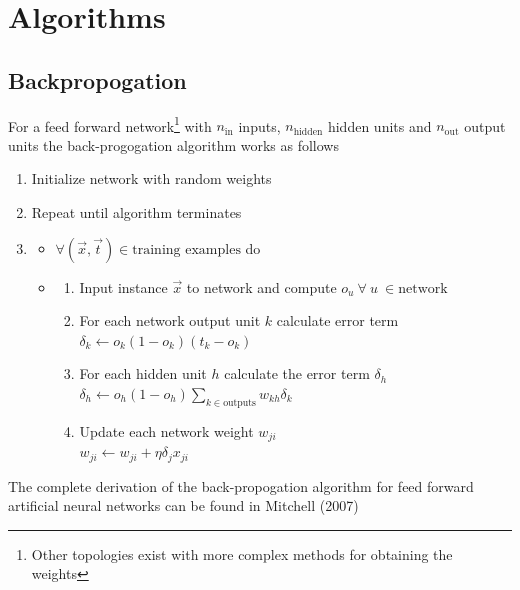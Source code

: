 
\chapter{Algorithms} \label{chap:app_algo}
\section{Backpropogation}
For a feed forward network\footnote{Other topologies exist with more complex methods for obtaining the weights} with $n_\text{in}$ inputs, $n_\text{hidden}$ hidden units and $n_\text{out}$ output units the back-progogation algorithm works as follows
\begin{enumerate}
\item Initialize network with random weights
\item Repeat until algorithm terminates
\item 
\begin{itemize}
\item $\forall (\vec{x},\vec{t}) \in \text{training examples}$ do
\item 
\begin{enumerate}
\item Input instance $\vec{x}$ to network and compute $o_u\ \forall\ u\ \in \text{network}$
\item For each network output unit $k$ calculate error term\\
$\delta_k \leftarrow o_k (1-o_k)(t_k - o_k)$
\item For each hidden unit $h$ calculate the error term $\delta_h$\\
$\delta_h \leftarrow o_h (1- o_h) \sum_{k \in \text{outputs}} w_{kh}\delta_k$
\item Update each network weight $w_{ji}$\\
$w_{ji} \leftarrow w_{ji} + \eta \delta_j x_{ji}$
\end{enumerate}
\end{itemize}
\end{enumerate}
The complete derivation of the back-propogation algorithm for feed forward artificial neural networks can be found in Mitchell (2007) \cite{Mitchell1997}



